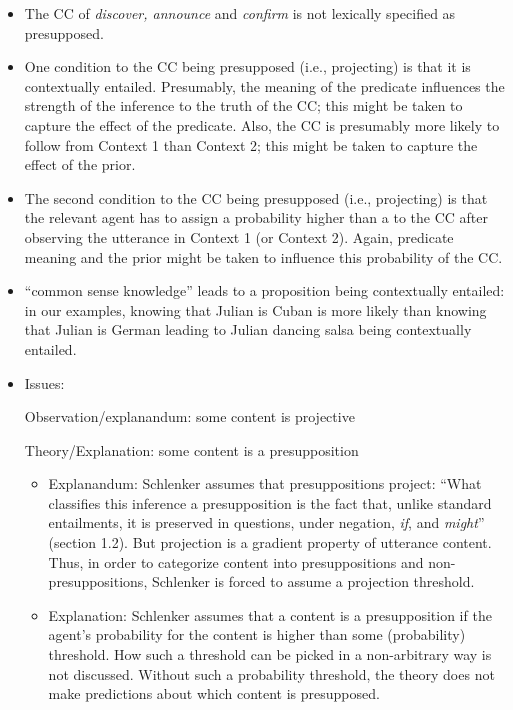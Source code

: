 \documentclass[11pt,fleqn]{article}
\newcommand{\6}{\mbox{$[\hspace*{-.6mm}[$}}
\newcommand{\9}{\mbox{$]\hspace*{-.6mm}]$}}
\begin{document}
\begin{itemize}

\item The CC of {\em discover, announce} and {\em confirm} is not lexically specified as presupposed.

\item One condition to the CC being presupposed (i.e., projecting) is that it is contextually entailed. Presumably, the meaning of the predicate influences the strength of the inference to the truth of the CC; this might be taken to capture the effect of the predicate. Also, the CC is presumably more likely to follow from Context 1 than Context 2; this might be taken to capture the effect of the prior.

\item The second condition to the CC being presupposed (i.e., projecting) is that the relevant agent has to assign a probability higher than a to the CC after observing the utterance in Context 1 (or Context 2). Again, predicate meaning and the prior might be taken to influence this probability of the CC.

\item ``common sense knowledge'' leads to a proposition being contextually entailed: in our examples, knowing that Julian is Cuban is more likely than knowing that Julian is German leading to Julian dancing salsa being contextually entailed.

\item Issues:

Observation/explanandum: some content is projective

Theory/Explanation: some content is a presupposition

\begin{itemize}

\item Explanandum: Schlenker assumes that presuppositions project: ``What classifies this inference a presupposition is the fact that, unlike standard entailments, it is preserved in questions, under negation, {\em if}, and {\em might}'' (section 1.2). But projection is a gradient property of utterance content. Thus, in order to categorize content into presuppositions and non-presuppositions, Schlenker is forced to assume a projection threshold.

\item Explanation: Schlenker assumes that a content is a presupposition if the agent's probability for the content is higher than some (probability) threshold. How such a threshold can be picked in a non-arbitrary way is not discussed. Without such a probability threshold, the theory does not make predictions about which content is presupposed.


\end{itemize}
\end{itemize}
\end{document}
